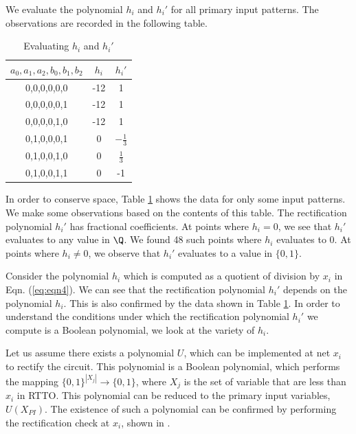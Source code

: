 \begin{Example}
We evaluate the polynomial $h_i$ and $h_i'$ for all primary input patterns. The observations are recorded in the following table. 
\vspace{2mm}
\begin{table}[ht]
    \centering
    \begin{tabular}{|c|c|c|} \hline
      $a_0,a_1,a_2,b_0,b_1,b_2$ & $h_i$ & $h_i'$ \\ \hline
       0,0,0,0,0,0 & -12 & 1\\ \hline
       0,0,0,0,0,1 & -12 & 1\\ \hline
       0,0,0,0,1,0 & -12 & 1\\ \hline
       0,1,0,0,0,1 & 0 & $-\frac{1}{3}$\\ \hline
       0,1,0,0,1,0 & 0 & $\frac{1}{3}$\\ \hline
       0,1,0,0,1,1 & 0 & -1 \\ \hline
    \end{tabular}
    \caption{Evaluating $h_i$ and $h_i'$}
    \label{tab:quosol}
\end{table}

In order to conserve space, Table \ref{tab:quosol} shows the data for only some input patterns. We make some observations based on the contents of this table. The rectification polynomial $h_i'$ has fractional coefficients. At points where $h_i = 0$, we see that $h_i'$ evaluates to any value in $\Q$. We found 48 such points where $h_i$ evaluates to 0. At points where $h_i \neq 0$, we observe that $h_i'$ evaluates to a value in $\{0,1\}$.
\end{Example}

Consider the polynomial $h_i$ which is computed as a quotient of division by $x_i$ in Eqn. (\ref{eq:eqn4}). We can see that the rectification polynomial $h_i'$ depends on the polynomial $h_i$. This is also confirmed by the data shown in Table \ref{tab:quosol}. In order to understand the conditions under which the rectification polynomial $h_i'$ we compute is a Boolean polynomial, we look at the variety of $h_i$.

Let us assume there exists a polynomial $U$, which can be implemented at net $x_i$ to rectify the circuit. This polynomial is a Boolean polynomial, which performs the mapping $\{0,1\}^{|X_j|} \rightarrow \{0,1\}$, where $X_j$ is the set of variable that are less than $x_i$ in RTTO. This polynomial can be reduced to the primary input variables, $U(X_{PI})$. The existence of such a polynomial can be confirmed by performing the rectification check at $x_i$, shown in \cite{utkarsh:fmcad18}. 

